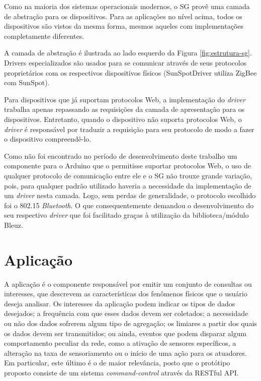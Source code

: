 \documentclass[12pt,a4paper,oneside]{report}
\begin{document}
Como na maioria dos sistemas operacionais modernos, o SG provê uma camada de abstração para os dispositivos. Para as aplicações no nível acima, todos os dispositivos são vistos da mesma forma, mesmos aqueles com implementações completamente diferentes.

A camada de abstração é ilustrada ao lado esquerdo da Figura \ref{fig:estrutura-sg}. Drivers especializados são usados para se comunicar através de seus protocolos proprietários com os respectivos dispositivos físicos (SunSpotDriver utiliza ZigBee com SunSpot).

Para dispositivos que já suportam protocolos Web, a implementação do \emph{driver} trabalha apenas repassando as requisições da camada de apresentação para os dispositivos. Entretanto, quando o dispositivo não suporta protocolos Web, o \emph{driver} é responsável por traduzir a requisição para seu protocolo de modo a fazer o dispositivo compreendê-lo.

Como não foi encontrado no período de desenvolvimento deste trabalho um componente para o Arduino que o permitisse suportar protocolos Web, o uso de qualquer protocolo de comunicação entre ele e o SG não trouxe grande variação, pois, para qualquer padrão utilizado haveria a necessidade da implementação de um \emph{driver} nesta camada. Logo, sem perdas de generalidade, o protocolo escolhido foi o 802.15 \emph{Bluetooth}. O que consequentemente demandou o desenvolvimento do seu respectivo \emph{driver} que foi facilitado graças à utilização da biblioteca/módulo Bleuz.

\section{Aplicação}

A aplicação é o componente responsável por emitir um conjunto de consultas ou interesses, que descrevem as características dos fenômenos físicos que o usuário deseja analisar. Os interesses da aplicação podem indicar os tipos de dados desejados; a frequência com que esses dados devem ser coletados; a necessidade ou não dos dados sofrerem algum tipo de agregação; os limiares a partir dos quais os dados devem ser transmitidos; ou ainda, eventos que podem disparar algum comportamento peculiar da rede, como a ativação de sensores específicos, a alteração na taxa de sensoriamento ou o início de uma ação para os atuadores. Em particular, este último é o de maior relevância, posto que o protótipo proposto consiste de um sistema  \emph{command-control} através da RESTful API.
\end{document}

